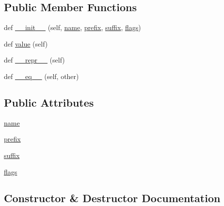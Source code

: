 \subsection*{Public Member Functions}
\begin{DoxyCompactItemize}
\item 
def \hyperlink{classpip_1_1__vendor_1_1distlib_1_1util_1_1ExportEntry_a2f524e61d4dcece88fea92b38494b2e5}{\+\_\+\+\_\+init\+\_\+\+\_\+} (self, \hyperlink{classpip_1_1__vendor_1_1distlib_1_1util_1_1ExportEntry_ae40bc4173caf8973b888623b5c1cbaae}{name}, \hyperlink{classpip_1_1__vendor_1_1distlib_1_1util_1_1ExportEntry_a6ee53840df9291a5cf87cf0bf911238d}{prefix}, \hyperlink{classpip_1_1__vendor_1_1distlib_1_1util_1_1ExportEntry_a5b6599db02675b4fe4798a6b1a3c786d}{suffix}, \hyperlink{classpip_1_1__vendor_1_1distlib_1_1util_1_1ExportEntry_a71f77a75cde1c4093b4dfebc7653cc6e}{flags})
\item 
def \hyperlink{classpip_1_1__vendor_1_1distlib_1_1util_1_1ExportEntry_a9539b5979cb04b54812b45cd4482c1be}{value} (self)
\item 
def \hyperlink{classpip_1_1__vendor_1_1distlib_1_1util_1_1ExportEntry_ab2d5bf6916f1d19114e4e0c0227da509}{\+\_\+\+\_\+repr\+\_\+\+\_\+} (self)
\item 
def \hyperlink{classpip_1_1__vendor_1_1distlib_1_1util_1_1ExportEntry_ab0ee394c0555d4c70563c55e74b88aa9}{\+\_\+\+\_\+eq\+\_\+\+\_\+} (self, other)
\end{DoxyCompactItemize}
\subsection*{Public Attributes}
\begin{DoxyCompactItemize}
\item 
\hyperlink{classpip_1_1__vendor_1_1distlib_1_1util_1_1ExportEntry_ae40bc4173caf8973b888623b5c1cbaae}{name}
\item 
\hyperlink{classpip_1_1__vendor_1_1distlib_1_1util_1_1ExportEntry_a6ee53840df9291a5cf87cf0bf911238d}{prefix}
\item 
\hyperlink{classpip_1_1__vendor_1_1distlib_1_1util_1_1ExportEntry_a5b6599db02675b4fe4798a6b1a3c786d}{suffix}
\item 
\hyperlink{classpip_1_1__vendor_1_1distlib_1_1util_1_1ExportEntry_a71f77a75cde1c4093b4dfebc7653cc6e}{flags}
\end{DoxyCompactItemize}


\subsection{Constructor \& Destructor Documentation}
\mbox{\label{classpip_1_1__vendor_1_1distlib_1_1util_1_1ExportEntry_a2f524e61d4dcece88fea92b38494b2e5}} 
